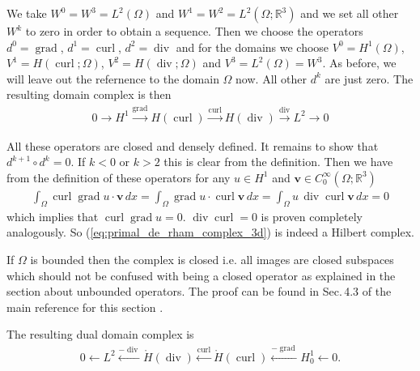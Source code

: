 \documentclass[12pt,a4paper]{article}
\numberwithin{equation}{subsection}
\numberwithin{lemma}{subsection}
\theoremstyle{definition}
\DeclareMathOperator{\curl}{curl}
\DeclareMathOperator{\diver}{div}
\DeclareMathOperator{\grad}{grad}
\newcommand{\real}{\mathbb{R}}
\begin{document}
We take $W^0 = W^3 = L^2(\Omega)$ and $W^1 = W^2 = L^2(\Omega;\real^3)$ 
and we set all other $W^k$ to zero in order to obtain a sequence.
Then we choose the operators $d^0 = \grad$, $d^1 = \curl$, $d^2 = \diver$ and
for the domains we choose $V^0 = H^1(\Omega)$, $V^1 = H(\curl;\Omega)$, 
$V^2 = H(\diver;\Omega)$ and $V^3 = L^2(\Omega) = W^3$. 
As before, we will leave out the refernence to the domain $\Omega$ now.
All other 
$d^k$ are just zero. The resulting domain complex is then
\begin{align}
    0 \rightarrow H^1 \xrightarrow{\grad} H(\curl)
        \xrightarrow{\curl} H(\diver) \xrightarrow{\diver} L^2 \rightarrow 0
    \label{eq:primal_de_rham_complex_3d}
\end{align}

All these operators are closed and densely defined. It remains to show that 
$d^{k+1} \circ d^k = 0$. If $k < 0$ or $k>2$ this is clear from the definition. 
Then we have from the definition of these operators 
for any $u \in H^1$ and $\mathbf{v} \in C^\infty_0(\Omega;\real^3)$  
\begin{align*}
    \int_\Omega \curl \grad u \cdot \mathbf{v} \, dx 
    = \int_\Omega \grad u \cdot \curl \mathbf{v} \, dx 
    = \int_\Omega u \, \diver \curl \mathbf{v} \, dx
    = 0
\end{align*}
which implies that $\curl \grad u = 0$. $\diver \curl = 0$ is proven 
completely analogously. So (\ref{eq:primal_de_rham_complex_3d}) is indeed a 
Hilbert complex. 

If $\Omega$ is bounded then the complex is closed i.e. all images 
are closed subspaces which should not be confused with being a closed operator
as explained in the section about unbounded operators. The proof can be found 
in Sec.\,4.3 of the main reference for this section \cite{arnold}.

The resulting dual domain complex is 
\begin{align*}
    0 \leftarrow L^2 \xleftarrow{-\diver} \mathring{H}(\diver)
        \xleftarrow{\curl} \mathring{H}(\curl) 
        \xleftarrow{-\grad} H^1_0 \leftarrow 0.
\end{align*}
\end{document}
